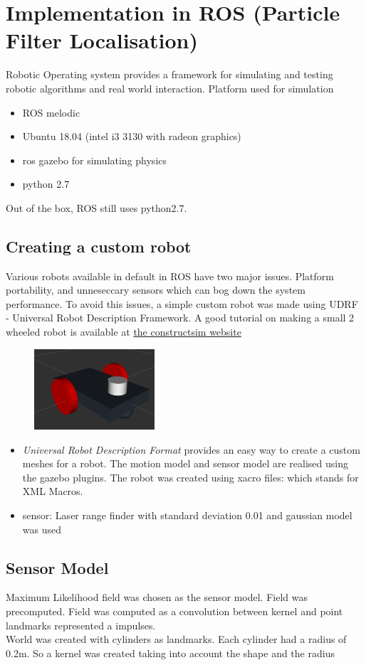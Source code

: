 \documentclass{article}
\begin{document}
\section{Implementation in ROS (Particle Filter Localisation)}
Robotic Operating system provides a framework for simulating and testing robotic algorithms and real world interaction. Platform used for simulation 
\begin{itemize}
        \item ROS melodic 
        \item Ubuntu 18.04 (intel i3 3130 with radeon graphics)
        \item ros gazebo for simulating physics
        \item python 2.7
\end{itemize}
Out of the box, ROS still uses python2.7. \\
\subsection{Creating a custom robot}
Various robots available in default in ROS have two major issues. Platform portability, and unneseccary sensors which can bog down the system performance. To avoid this issues, a simple custom robot was made using UDRF - Universal Robot Description Framework. A good tutorial on making a small 2 wheeled robot is available at \href{https://www.theconstructsim.com/ros-projects-exploring-ros-using-2-wheeled-robot-part-1/}{the constructsim website} 
\begin{figure}
    \centering
    \includegraphics[height=30mm]{./custom_robot.png}
\end{figure}
\begin{itemize}
\item \textit{Universal Robot Description Format} provides an easy way to create a custom meshes for a robot. The motion model and sensor model are realised using the gazebo plugins. The robot was created using xacro files: which stands for XML Macros. 
\item sensor: Laser range finder with standard deviation 0.01 and gaussian model was used
\end{itemize}
\subsection{Sensor Model}
Maximum Likelihood field was chosen as the sensor model. Field was precomputed. Field was computed as a convolution between kernel and point landmarks represented a impulses. \\
World was created with cylinders as landmarks. Each cylinder had a radius of 0.2m. So a kernel was created taking into account the shape and the radius
\end{document}
